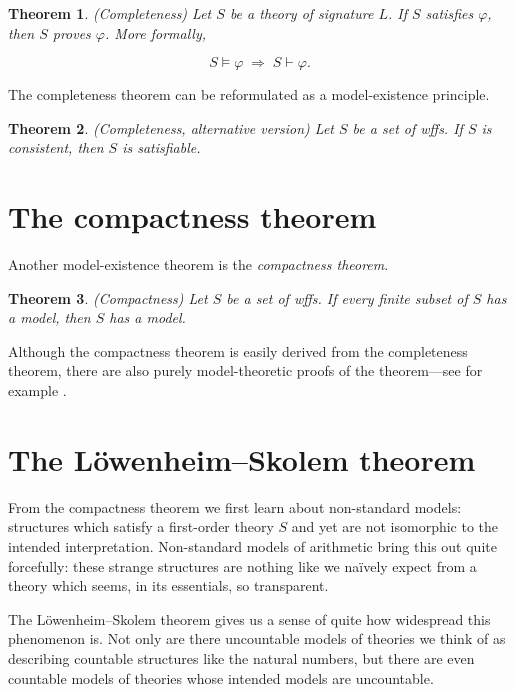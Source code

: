 \documentclass[10pt, a4paper, oneside]{article}
\newtheorem{thm}{Theorem}[section]
\theoremstyle{definition}
\theoremstyle{remark}
\theoremstyle{plain}
\begin{document}
\begin{thm}
    (Completeness) Let $S$ be a theory of signature $L$. If $S$ satisfies
    $\varphi$, then $S$ proves $\varphi$. More formally,
    
    \begin{displaymath}
        S \models \varphi \; \Longrightarrow \; S \vdash \varphi.
    \end{displaymath}
\end{thm}

The completeness theorem can be reformulated as a model-existence principle.

\begin{thm}
    (Completeness, alternative version) Let $S$ be a set of wffs. If $S$ is
    consistent, then $S$ is satisfiable.
\end{thm}


\section{The compactness theorem}

Another model-existence theorem is the \emph{compactness theorem}.

\begin{thm}
    (Compactness) Let $S$ be a set of wffs. If every finite subset of $S$ has a
    model, then $S$ has a model.
\end{thm}

Although the compactness theorem is easily derived from the completeness
theorem, there are also purely model-theoretic proofs of the theorem---see for
example \citet[pp. 125--127]{hodges1997}.


\section{The Löwenheim--Skolem theorem}

From the compactness theorem we first learn about non-standard models:
structures which satisfy a first-order theory $S$ and yet are not isomorphic to
the intended interpretation. Non-standard models of arithmetic bring this out
quite forcefully: these strange structures are nothing like we naïvely expect
from a theory which seems, in its essentials, so transparent.

The Löwenheim--Skolem theorem gives us a sense of quite how widespread this
phenomenon is. Not only are there uncountable models of theories we think of as
describing countable structures like the natural numbers, but there are even
countable models of theories whose intended models are uncountable.
\end{document}
